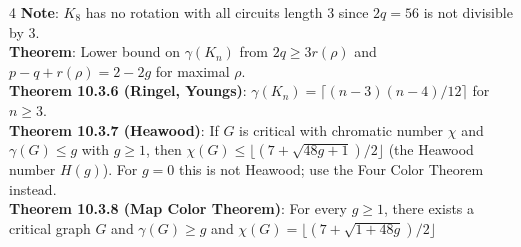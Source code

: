 \documentclass[letterpaper, 8pt]{extarticle}
\begin{document}
\begin{multicols*}{4}
	\textbf{Note}: $K_8$ has no rotation with all circuits length $3$ since $2q=56$ is not divisible by $3$. \\
	\textbf{Theorem}: Lower bound on $\gamma(K_n)$ from $2q\ge 3r(\rho)$ and $p-q+r(\rho)=2-2g$ for maximal $\rho$. \\
	\textbf{Theorem 10.3.6 (Ringel, Youngs)}: $\gamma(K_n)=\lceil (n-3)(n-4)/12 \rceil$ for $n\ge 3$. \\
	\textbf{Theorem 10.3.7 (Heawood)}: If $G$ is critical with chromatic number $\chi$ and $\gamma(G)\le g$ with $g\ge 1$, then $\chi(G) \le \lfloor (7+\sqrt{48g+1})/2 \rfloor$ (the Heawood number $H(g)$). For $g=0$ this is not Heawood; use the Four Color Theorem instead. \\
	\textbf{Theorem 10.3.8 (Map Color Theorem)}: For every $g\ge 1$, there exists a critical graph $G$ and $\gamma(G) \ge g$ and $\chi (G) = \lfloor (7 + \sqrt{1 + 48g})/2 \rfloor$ \\

\end{multicols*}
\end{document}
